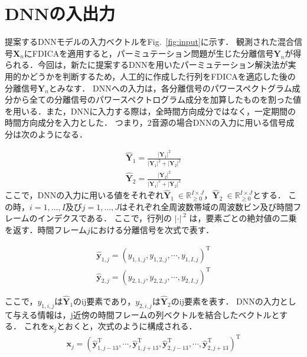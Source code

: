 \section{DNNの入出力}
\label{sec:in-out}

提案するDNNモデルの入力ベクトルをFig.~\ref{fig:input}に示す．
観測された混合信号$\bm{X}_n$にFDICAを適用すると，パーミュテーション問題が生じた分離信号$\bm{Y}_n$が得られる．今回は，新たに提案するDNNを用いたパーミュテーション解決法が実用的かどうかを判断するため，人工的に作成した行列をFDICAを適応した後の分離信号$\bm{Y}_n$とみなす．
DNNへの入力は，各分離信号のパワースペクトグラム成分から全ての分離信号のパワースペクトログラム成分を加算したものを割った値を用いる．また，DNNに入力する際は，全時間方向成分ではなく，一定期間の時間方向成分を入力とした．
つまり，2音源の場合DNNの入力に用いる信号成分は次のようになる．

\begin{align}
    \widehat{\bm{Y}}_1  = \frac{|\bm{Y}_1|^2}{|\bm{Y}_1|^2+|\bm{Y}_2|^2}\\
    \widehat{\bm{Y}}_2  = \frac{|\bm{Y}_2|^2}{|\bm{Y}_1|^2+|\bm{Y}_2|^2}
\end{align}
ここで，DNNの入力に用いる値をそれぞれ$\widehat{\bm{Y}}_1~\in \mathbb{R}_{\geq 0}^{I \times J}$，$\widehat{\bm{Y}}_2 ~\in \mathbb{R}_{\geq 0}^{I \times J}$とする．
この時，$i = 1,\ldots,I$及び$j = 1,\ldots,J$はそれぞれ全周波数帯域の周波数ビン及び時間フレームのインデクスである．
ここで，行列の $|\cdot|^{.2}$ は，要素ごとの絶対値の二乗を返す．時間フレーム$j$における分離信号を次式で表す．

\begin{align}
    \widehat{\bm{y}}_{1,j}  = (y_{1,1,j},y_{1,2,j},\cdots,y_{1,I,j} )^\mathrm{T}\\
    \widehat{\bm{y}}_{2,j}  = (y_{2,1,j},y_{2,2,j},\cdots,y_{2,I,j} )^\mathrm{T}
\end{align}

ここで，$y_{1,i,j}$は$\widehat{\bm{Y}}_1$のij要素であり，$y_{2,i,j}$は$\widehat{\bm{Y}}_2$のij要素を表す．
DNNの入力として与える情報は，j近傍の時間フレームの列ベクトルを結合したベクトルとする．
これを$\bm{x}_j$とおくと，次式のように構成される．
\begin{align}
    \bm{x}_j = (\widehat{\bm{y}}_{1,j-13}^\mathrm{T}, \cdots,\widehat{\bm{y}}_{1,j+13}^\mathrm{T}, \widehat{\bm{y}}_{2,j-13}^\mathrm{T},\cdots,\widehat{\bm{y}}_{2,j+13}^\mathrm{T} )^\mathrm{T}
\end{align}

